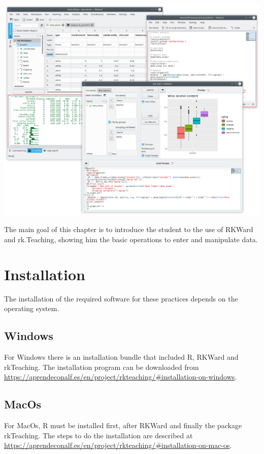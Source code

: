 \begin{center}
  \includegraphics[width=\textwidth]{chapters/introduction/img/rkward}
\end{center}

The main goal of this chapter is to introduce the student to the use of RKWard and rk.Teaching, showing him the basic
operations to enter and manipulate data.

\section{Installation}
The installation of the required software for these practices depends on the operating system.

\subsection{Windows}
For Windows there is an installation bundle that included R, RKWard and rkTeaching. The installation program can be downloaded from \url{https://aprendeconalf.es/en/project/rkteaching/#installation-on-windows}.

\subsection{MacOs}
For MacOs, R must be installed first, after RKWard and finally the package rkTeaching. The steps to do the installation are described at \url{https://aprendeconalf.es/en/project/rkteaching/#installation-on-mac-os}.

